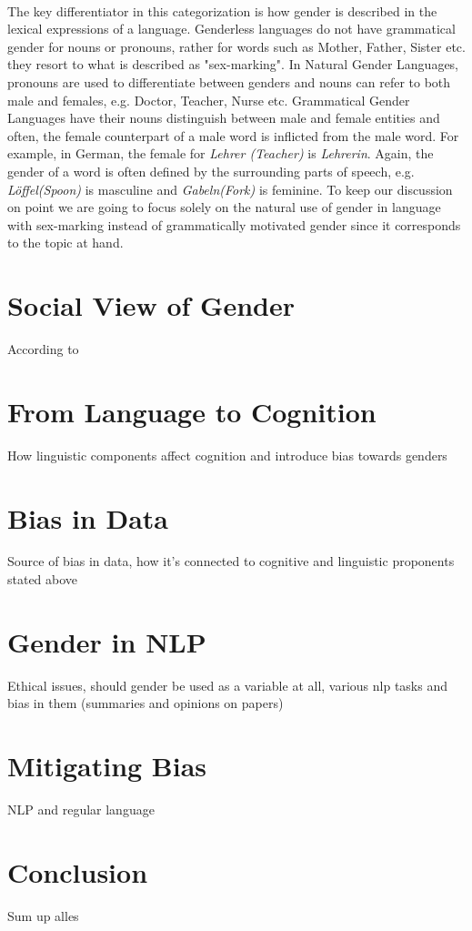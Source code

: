 \documentclass{article}
\begin{document}
\noindent
\\
The key differentiator in this categorization is how gender is described in the lexical expressions of a language. Genderless languages do not have grammatical gender for nouns or pronouns, rather for words such as Mother, Father, Sister etc. they resort to what is described as "sex-marking". In Natural Gender Languages, pronouns are used to differentiate between genders and nouns can refer to both male and females, e.g. Doctor, Teacher, Nurse etc. Grammatical Gender Languages have their nouns distinguish between male and female entities and often, the female counterpart of a male word is inflicted from the male word. For example, in German, the female for \textit{Lehrer (Teacher)} is \textit{Lehrerin}. Again, the gender of a word is often defined by the surrounding parts of speech, e.g. \textit{Löffel(Spoon)} is masculine and \textit{Gabeln(Fork)} is feminine. To keep our discussion on point we are going to focus solely on the natural use of gender in language with sex-marking instead of grammatically motivated gender since it corresponds to the topic at hand.

\section{Social View of Gender}
According to \cite{larson2017gender}

\section{From Language to Cognition}
How linguistic components affect cognition and introduce bias towards genders

\section{Bias in Data}
Source of bias in data, how it's connected to cognitive and linguistic proponents stated above

\section{Gender in NLP}
Ethical issues, should gender be used as a variable at all, various nlp tasks and bias in them (summaries and opinions on papers)

\section{Mitigating Bias}
NLP and regular language

\section{Conclusion}
Sum up alles

\clearpage


\end{document}
